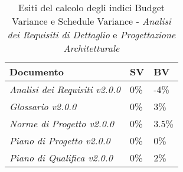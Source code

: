     \begin{table}[H]
    	\centering
    	\begin{tabular}{|C{7cm}|C{2cm}|C{2cm}|}
    		\hline
    		\textbf{Documento} & \textbf{SV} & \textbf{BV}  \\
    		\hline
    		\textit{Analisi dei Requisiti v2.0.0} & 0\% & -4\%  \\
    		\hline
    		\textit{Glossario v2.0.0} & 0\% &  3\% \\
    		\hline
    		\textit{Norme di Progetto v2.0.0} & 0\% & 3.5\% \\
    		\hline
    		\textit{Piano di Progetto v2.0.0} & 0\% & 0\% \\
    		\hline
    		\textit{Piano di Qualifica v2.0.0} & 0\% & 2\% \\
    		\hline
    		
    	\end{tabular}
    	\caption{Esiti del calcolo degli indici Budget Variance e Schedule Variance - \textit{Analisi dei Requisiti di Dettaglio} e \textit{Progettazione Architetturale}}
    \end{table}